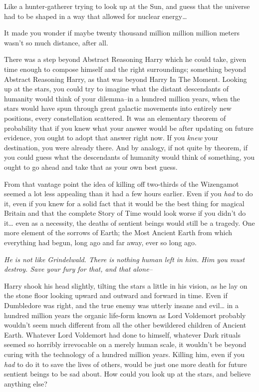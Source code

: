Like a hunter-gatherer trying to look up at the Sun, and guess that the universe had to be shaped in a way that allowed for nuclear energy{\ldots}

It made you wonder if maybe twenty thousand million million million meters wasn't so much distance, after all.

There was a step beyond Abstract Reasoning Harry which he could take, given time enough to compose himself and the right surroundings; something beyond Abstract Reasoning Harry, as that was beyond Harry In The Moment. Looking up at the stars, you could try to imagine what the distant descendants of humanity would think of your dilemma\---in a hundred million years, when the stars would have spun through great galactic movements into entirely new positions, every constellation scattered. It was an elementary theorem of probability that if you knew what your answer would be after updating on future evidence, you ought to adopt that answer right now. If you \emph{knew} your destination, you were already there. And by analogy, if not quite by theorem, if you could guess what the descendants of humanity would think of something, you ought to go ahead and take that as your own best guess.

From that vantage point the idea of killing off two-thirds of the Wizengamot seemed a lot less appealing than it had a few hours earlier. Even if you \emph{had} to do it, even if you knew for a solid fact that it would be the best thing for magical Britain and that the complete Story of Time would look worse if you didn't do it{\ldots} even as a necessity, the deaths of sentient beings would still be a tragedy. One more element of the sorrows of Earth; the Most Ancient Earth from which everything had begun, long ago and far away, ever so long ago.

\emph{He is not like Grindelwald. There is nothing human left in him. Him you must destroy. Save your fury for that, and that alone\---}

Harry shook his head slightly, tilting the stars a little in his vision, as he lay on the stone floor looking upward and outward and forward in time. Even if Dumbledore was right, and the true enemy was utterly insane and evil{\ldots} in a hundred million years the organic life-form known as Lord Voldemort probably wouldn't seem much different from all the other bewildered children of Ancient Earth. Whatever Lord Voldemort had done to himself, whatever Dark rituals seemed so horribly irrevocable on a merely human scale, it wouldn't be beyond curing with the technology of a hundred million years. Killing him, even if you \emph{had} to do it to save the lives of others, would be just one more death for future sentient beings to be sad about. How could you look up at the stars, and believe anything else?

